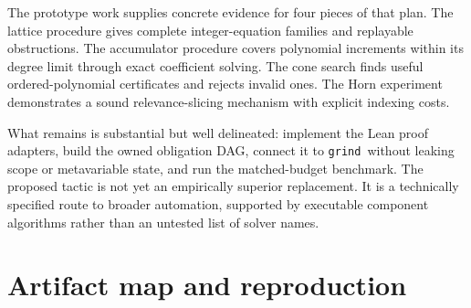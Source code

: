 \documentclass[11pt,a4paper]{article}
\newcommand{\grind}{\texttt{grind}}
\begin{document}
The prototype work supplies concrete evidence for four pieces of that plan. The lattice procedure gives complete integer-equation families and replayable obstructions. The accumulator procedure covers polynomial increments within its degree limit through exact coefficient solving. The cone search finds useful ordered-polynomial certificates and rejects invalid ones. The Horn experiment demonstrates a sound relevance-slicing mechanism with explicit indexing costs.

What remains is substantial but well delineated: implement the Lean proof adapters, build the owned obligation DAG, connect it to \grind\ without leaking scope or metavariable state, and run the matched-budget benchmark. The proposed tactic is not yet an empirically superior replacement. It is a technically specified route to broader automation, supported by executable component algorithms rather than an untested list of solver names.

\appendix
\section{Artifact map and reproduction}
\label{app:artifact}
\end{document}
